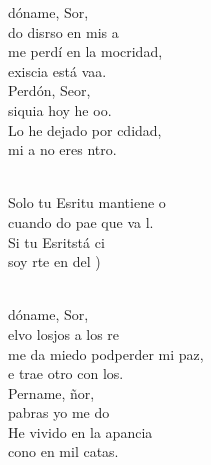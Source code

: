 \documentclass[12pt]{article}
\begin{document}
\begin{multicols*}{2}
\begin{cancion}%
	dóname, Sor, \\
	do disrso en mis a \\
	me perdí en la mocridad,\\
	 exiscia está vaa. \\
	Perdón, Seor,\\
	 siquia hoy he oo. \\
	Lo he dejado por cdidad,\\
	 mi a no eres ntro.\\\jump\\
	\begin{chorus}%
	Solo tu Esritu  mantiene o \\
	cuando do pae que va l.\\
	Si tu Esritstá ci\\
	soy rte en del ) \\
	\end{chorus}%
	\jump\\
	dóname, Sor, \\
	elvo losjos a los re \\
	me da miedo podperder mi paz,\\
	e trae otro con los.\\
	Pername, ñor,\\
	 pabras yo me do \\
	He vivido en la apancia\\
	cono en mil catas.\\
\end{cancion}%


\end{multicols*}
\end{document}

